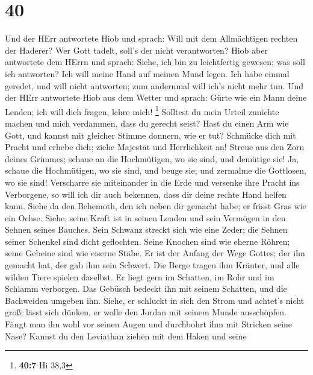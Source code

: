 \hypertarget{section-10}{%
\section{40}\label{section-10}}

 Und der HErr antwortete Hiob und sprach:  Will
mit dem Allmächtigen rechten der Haderer? Wer Gott tadelt, soll's der
nicht verantworten?  Hiob aber antwortete dem HErrn und
sprach:  Siehe, ich bin zu leichtfertig gewesen; was soll
ich antworten? Ich will meine Hand auf meinen Mund legen. 
Ich habe einmal geredet, und will nicht antworten; zum andernmal will
ich's nicht mehr tun.  Und der HErr antwortete Hiob aus dem
Wetter und sprach:  Gürte wie ein Mann deine Lenden; ich
will dich fragen, lehre mich! \footnote{\textbf{40:7} Hi 38,3}
 Solltest du mein Urteil zunichte machen und mich verdammen,
dass du gerecht seist?  Hast du einen Arm wie Gott, und
kannst mit gleicher Stimme donnern, wie er tut?  Schmücke
dich mit Pracht und erhebe dich; ziehe Majestät und Herrlichkeit an!
 Streue aus den Zorn deines Grimmes; schaue an die
Hochmütigen, wo sie sind, und demütige sie!  Ja, schaue die
Hochmütigen, wo sie sind, und beuge sie; und zermalme die Gottlosen, wo
sie sind!  Verscharre sie miteinander in die Erde und
versenke ihre Pracht ins Verborgene,  so will ich dir auch
bekennen, dass dir deine rechte Hand helfen kann.  Siehe da
den Behemoth, den ich neben dir gemacht habe; er frisst Gras wie ein
Ochse.  Siehe, seine Kraft ist in seinen Lenden und sein
Vermögen in den Sehnen seines Bauches.  Sein Schwanz
streckt sich wie eine Zeder; die Sehnen seiner Schenkel sind dicht
geflochten.  Seine Knochen sind wie eherne Röhren; seine
Gebeine sind wie eiserne Stäbe.  Er ist der Anfang der Wege
Gottes; der ihn gemacht hat, der gab ihm sein Schwert.  Die
Berge tragen ihm Kräuter, und alle wilden Tiere spielen daselbst.
 Er liegt gern im Schatten, im Rohr und im Schlamm
verborgen.  Das Gebüsch bedeckt ihn mit seinem Schatten,
und die Bachweiden umgeben ihn.  Siehe, er schluckt in sich
den Strom und achtet's nicht groß; lässt sich dünken, er wolle den
Jordan mit seinem Munde ausschöpfen.  Fängt man ihn wohl
vor seinen Augen und durchbohrt ihm mit Stricken seine Nase?
 Kannst du den Leviathan ziehen mit dem Haken und seine
